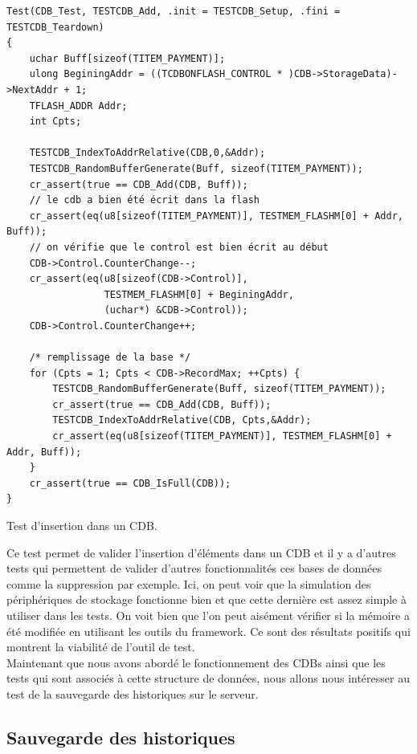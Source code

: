 \documentclass[a4paper]{article}
\begin{document}
\pagebreak
\begin{listing}[ht!]
\begin{verbatim}
Test(CDB_Test, TESTCDB_Add, .init = TESTCDB_Setup, .fini = TESTCDB_Teardown)
{
    uchar Buff[sizeof(TITEM_PAYMENT)];
    ulong BeginingAddr = ((TCDBONFLASH_CONTROL * )CDB->StorageData)->NextAddr + 1;
    TFLASH_ADDR Addr;
    int Cpts;

    TESTCDB_IndexToAddrRelative(CDB,0,&Addr);
    TESTCDB_RandomBufferGenerate(Buff, sizeof(TITEM_PAYMENT));
    cr_assert(true == CDB_Add(CDB, Buff));
    // le cdb a bien été écrit dans la flash
    cr_assert(eq(u8[sizeof(TITEM_PAYMENT)], TESTMEM_FLASHM[0] + Addr, Buff));
    // on vérifie que le control est bien écrit au début
    CDB->Control.CounterChange--;
    cr_assert(eq(u8[sizeof(CDB->Control)],
                 TESTMEM_FLASHM[0] + BeginingAddr,
                 (uchar*) &CDB->Control));
    CDB->Control.CounterChange++;

    /* remplissage de la base */
    for (Cpts = 1; Cpts < CDB->RecordMax; ++Cpts) {
        TESTCDB_RandomBufferGenerate(Buff, sizeof(TITEM_PAYMENT));
        cr_assert(true == CDB_Add(CDB, Buff));
        TESTCDB_IndexToAddrRelative(CDB, Cpts,&Addr);
        cr_assert(eq(u8[sizeof(TITEM_PAYMENT)], TESTMEM_FLASHM[0] + Addr, Buff));
    }
    cr_assert(true == CDB_IsFull(CDB));
}
\end{verbatim}
\caption{Test d'insertion dans un CDB.}
\label{extestinsertcdb}
\end{listing}

Ce test permet de valider l'insertion d'éléments dans un CDB et il y a d'autres
tests qui permettent de valider d'autres fonctionnalités ces bases de données
comme la suppression par exemple. Ici, on peut voir que la simulation des
périphériques de stockage fonctionne bien et que cette dernière est assez simple
à utiliser dans les tests. On voit bien que l'on peut aisément vérifier si la
mémoire a été modifiée en utilisant les outils du framework. Ce sont des
résultats positifs qui montrent la viabilité de l'outil de test.\\

Maintenant que nous avons abordé le fonctionnement des CDBs ainsi que les tests
qui sont associés à cette structure de données, nous allons nous intéresser au
test de la sauvegarde des historiques sur le serveur.

\subsection{Sauvegarde des historiques}
\label{savehist}
\end{document}
